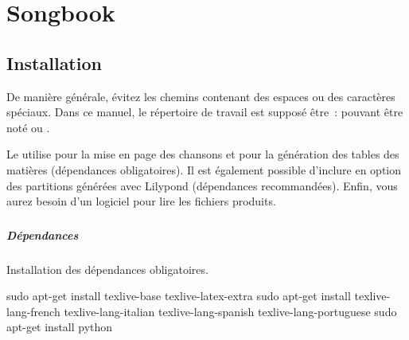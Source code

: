 \chapter{Songbook}
\setcounter{chapter}{1}
\label{chap:songbook}
\minitoc
{}


\section{Installation}
\label{sec:install}

De manière générale, évitez les chemins contenant des espaces ou des
caractères spéciaux. Dans ce manuel, le répertoire de travail est
supposé être~:  pouvant être noté
 ou .

Le \songbook utilise \latex pour la mise en page des chansons et
\python pour la génération des tables des matières (dépendances
obligatoires). Il est également possible d'inclure en option des
partitions générées avec Lilypond (dépendances recommandées). Enfin,
vous aurez besoin d'un logiciel pour lire les fichiers 
produits.

\subsection{\linux}

\paragraph{Dépendances}

Installation des dépendances obligatoires.
\begin{unix}
  sudo apt-get install texlive-base texlive-latex-extra
  sudo apt-get install texlive-lang-french texlive-lang-italian texlive-lang-spanish texlive-lang-portuguese
  sudo apt-get install python
\end{unix}

